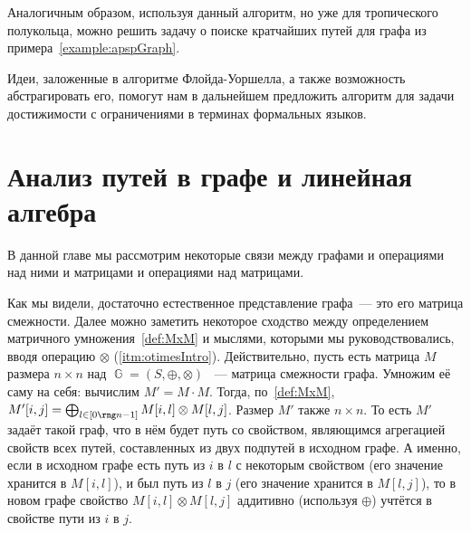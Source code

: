 Аналогичным образом, используя данный алгоритм, но уже для тропического полукольца, можно решить задачу о поиске кратчайших путей для графа из примера~\ref{example:apspGraph}.

Идеи, заложенные в алгоритме Флойда-Уоршелла, а также возможность абстрагировать его, помогут нам в дальнейшем предложить алгоритм для задачи достижимости с ограничениями в терминах формальных языков.

\section{Анализ путей в графе и линейная алгебра}

В данной главе мы рассмотрим некоторые связи%
между графами и операциями над ними и матрицами и операциями над матрицами.

Как мы видели, достаточно естественное представление графа~--- это его матрица смежности.
Далее можно заметить некоторое сходство между определением матричного умножения~\ref{def:MxM} и мыслями, которыми мы руководствовались, вводя операцию $\otimes$ (\ref{itm:otimesIntro}).
Действительно, пусть есть матрица $M$ размера $n \times n$ над $\BbbG = (S, \oplus, \otimes)$%
~--- матрица смежности графа.
Умножим её саму на себя: вычислим $M'= M \cdot M$.
Тогда, по~\ref{def:MxM}, $M'[i, j] = \bigoplus_{l \in [0 \rng n-1]} M[i, l] \otimes M[l, j]$.
Размер $M'$ также $n \times n$.
То есть $M'$ задаёт такой граф, что в нём будет путь со свойством, являющимся агрегацией свойств всех путей, составленных из двух подпутей в исходном графе.
А именно, если в исходном графе есть путь из $i$ в $l$ с некоторым свойством (его значение хранится в $M[i, l]$), и был путь из $l$ в $j$ (его значение хранится в $M[l,j]$), то в новом графе свойство $M[i, l] \otimes M[l, j]$ аддитивно (используя $\oplus$) учтётся в свойстве пути из $i$ в $j$.


